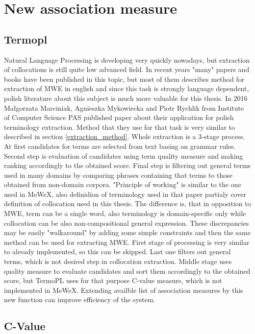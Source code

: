 \chapter{New association measure}


\section{Termopl}
Natural Language Processing is developing very quickly nowadays, but extraction of collocations is still quite low advanced field. 
In recent years "many" papers and books have been published in this topic, but most of them describes method for extraction of MWE in english 
and since this task is strongly language dependent, polish literature about this subject is much more valuable for this thesis.
In 2016 Małgorzata Marciniak, Agnieszka Mykowiecka and Piotr Rychlik from Institute of Computer Science PAS published paper about their application 
for polish terminology extraction. Method that they use for that task is very similar to described in section \ref{extraction_method}. 
Whole extraction is a 3-stage process. At first candidates for terms are selected from text basing on grammar rules. 
Second step is evaluation of candidates using term quality measure and making ranking accordingly to the obtained score. 
Final step is filtering out general terms used in many domains by comparing phrases containing that terms to those obtained from non-domain corpora.
"Principle of working" is similar to the one used in MeWeX, also definidion of terminology used in that paper 
partialy cover definition of collocation used in this thesis. The difference is, that in opposition to MWE, term can be a single word, 
also terminology is domain-specific only while collocation can be also non-compositional general expression. 
These discrepancies may be easily "walkaround" by adding some simple constraints and then the same method can be used for extracting MWE. 
First stage of processing is very similar to already implemented, so this can be skipped. Last one filters out general terms, 
which is not desired step in collocation extraction. Middle stage uses quality measure to evaluate candidates and sort them 
accordingly to the obtained score, but TermoPL uses for that purpose C-value measure, which is not implemented in MeWeX. 
Extending availble list of association measures by this new function can improve efficiency of the system.

\section{C-Value}

